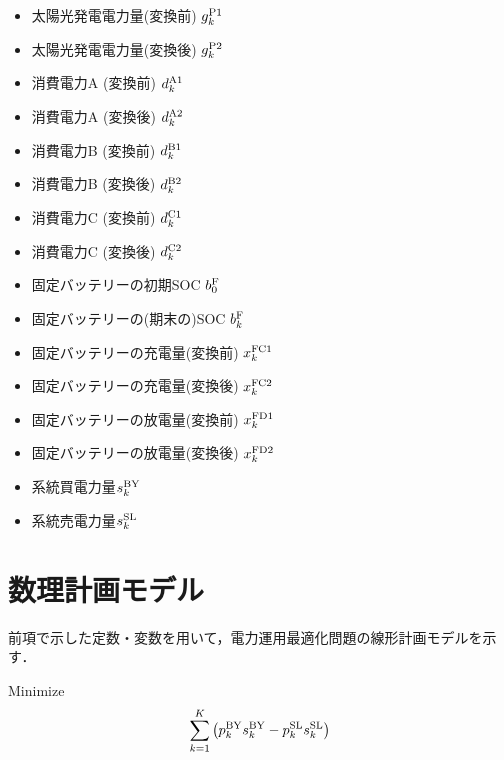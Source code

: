 \documentclass{jarticle}
\newcommand{\IB}{$\bullet$}
\newcommand{\IC}{$\circ$}
\begin{document}
 \begin{itemize}
  \item[\IB] 太陽光発電電力量(変換前) $g^{\rm P1}_{k}$
  \item[\IC] 太陽光発電電力量(変換後) $g^{\rm P2}_{k}$
  \item[\IC] 消費電力A (変換前) $d^{\rm A1}_{k}$
  \item[\IB] 消費電力A (変換後) $d^{\rm A2}_{k}$
  \item[\IC] 消費電力B (変換前) $d^{\rm B1}_{k}$
  \item[\IB] 消費電力B (変換後) $d^{\rm B2}_{k}$
  \item[\IC] 消費電力C (変換前) $d^{\rm C1}_{k}$
  \item[\IB] 消費電力C (変換後) $d^{\rm C2}_{k}$
  \item[\IB] 固定バッテリーの初期SOC $b^{\rm F}_{0}$
  \item[\IC] 固定バッテリーの(期末の)SOC $b^{\rm F}_{k}$
  \item[\IC] 固定バッテリーの充電量(変換前) $x^{\rm FC1}_{k}$
  \item[\IC] 固定バッテリーの充電量(変換後) $x^{\rm FC2}_{k}$
  \item[\IC] 固定バッテリーの放電量(変換前) $x^{\rm FD1}_{k}$
  \item[\IC] 固定バッテリーの放電量(変換後) $x^{\rm FD2}_{k}$ \\[-2.5ex]

  \item[\IC] 系統買電力量$s^{\rm BY}_{k}$
  \item[\IC] 系統売電力量$s^{\rm SL}_{k}$
\end{itemize}


\section{数理計画モデル}

前項で示した定数・変数を用いて，電力運用最適化問題の線形計画モデルを示す．
%

\noindent
{\rm Minimize}
\begin{equation}
 \sum_{k=1}^{K} \left( p^{\rm BY}_{k}s^{\rm BY}_{k} - p^{\rm SL}_{k}s^{\rm SL}_{k} \right)
 \label{eq:minimize}
\end{equation}
\end{document}

